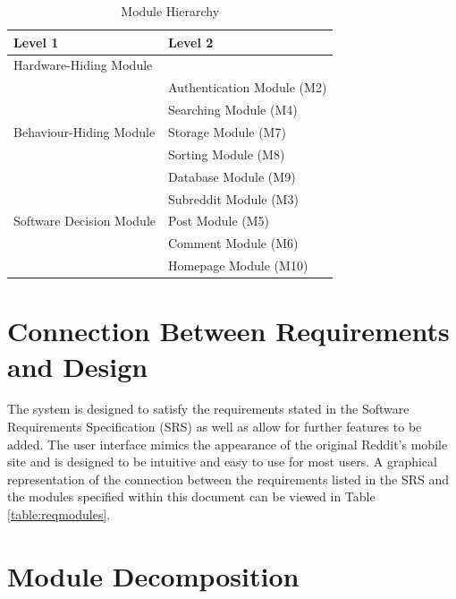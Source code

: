 \documentclass[12pt,fleqn]{article}
\begin{document}
\vspace{5mm}

\begin{table}[h!]
\centering
\begin{tabular}{p{} p{}}
\toprule
\textbf{Level 1} & \textbf{Level 2}\\
\midrule

{Hardware-Hiding Module} & ~ \\
\midrule

\multirow{5}{0.3\textwidth}{Behaviour-Hiding Module} 
& Authentication Module (M2)\\
& Searching Module (M4)\\
& Storage Module (M7)\\
& Sorting Module (M8)\\ 
& Database Module (M9)\\
\midrule

\multirow{3}{0.3\textwidth}{Software Decision Module}
& Subreddit Module (M3)\\
& Post Module (M5)\\
& Comment Module (M6)\\
& Homepage Module (M10)\\
\bottomrule

\end{tabular}
\caption{Module Hierarchy}
\label{TblMH}
\end{table}
\newpage

\section{Connection Between Requirements and Design} \label{sec:connection}

The system is designed to satisfy the requirements stated in the Software Requirements Specification (SRS) as well as allow for further features to be added. The user interface mimics the appearance of the original Reddit's mobile site and is designed to be intuitive and easy to use for most users. A graphical representation of the connection between the requirements listed in the SRS and the modules specified within this document can be viewed in Table \ref{table:reqmodules}.

\section{Module Decomposition} \label{sec:md}



\end{document}
